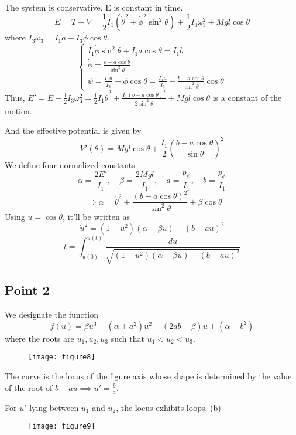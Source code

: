 \documentclass[12pt]{article}
\begin{document}
	The system is conservative, E is constant in time.
	$$ E = T+V = \frac{1}{2} I_1(\dot{\theta}^2 + \dot{\phi}^2\sin^2\theta) + \frac{1}{2}I_3\omega_3^2 + Mgl\cos\theta $$
	where $I_3\omega_3 = I_1a - I_3\dot{\phi}\cos\theta$.
	$$
	\begin{cases}
		I_1\dot{\phi}\sin^2\theta + I_1a\cos\theta = I_1b \\
		\dot{\phi} = \frac{b-a\cos\theta}{\sin^2\theta} \\
		\dot{\psi} = \frac{I_1a}{I_3} - \dot{\phi}\cos\theta = \frac{I_1a}{I_3} - \frac{b-a\cos\theta}{\sin^2\theta}\cos\theta
	\end{cases}
	$$
	Thus, $E' = E - \frac{1}{2}I_3\omega_3^2 = \frac{1}{2}I_1\dot{\theta}^2 + \frac{I_1(b-a\cos\theta)^2}{2\sin^2\theta} + Mgl\cos\theta$ is a constant of the motion.
	
	And the effective potential is given by
	$$ V'(\theta) = Mgl\cos\theta + \frac{I_1}{2}\left(\frac{b-a\cos\theta}{\sin\theta}\right)^2 $$
	We define four normalized constants
	$$ \alpha = \frac{2E'}{I_1}, \quad \beta = \frac{2Mgl}{I_1}, \quad a = \frac{p_\psi}{I_1}, \quad b = \frac{p_\phi}{I_1} $$
	$$ \implies \alpha = \dot{\theta}^2 + \frac{(b-a\cos\theta)^2}{\sin^2\theta} + \beta\cos\theta $$
	Using $u = \cos\theta$, it'll be written as
	$$ \dot{u}^2 = (1-u^2)(\alpha - \beta u) - (b-au)^2 $$
	$$ t = \int_{u(0)}^{u(t)} \frac{du}{\sqrt{(1-u^2)(\alpha - \beta u) - (b-au)^2}} $$
	
	\subsection*{Point 2}
	We designate the function
	$$ f(u) = \beta u^3 - (\alpha+a^2)u^2 + (2ab-\beta)u + (\alpha-b^2) $$
	where the roots are $u_1, u_2, u_3$ such that $u_1 < u_2 < u_3$. 
	
	\begin{figure}[h]
		\centering
		\texttt{[image: figure8]}
		\caption{}
		\label{fig:figure8}
	\end{figure}
	
	The curve is the locus of the figure axis whose shape is determined by the value of the root of $b-au \implies u' = \frac{b}{a}$.
	
	For $u'$ lying between $u_1$ and $u_2$, the locus exhibits loops. (b)
	
	\begin{figure}[h]
		\centering
		\texttt{[image: figure9]}
		\caption{}
		\label{fig:figure9}
	\end{figure}
	
\end{document}
